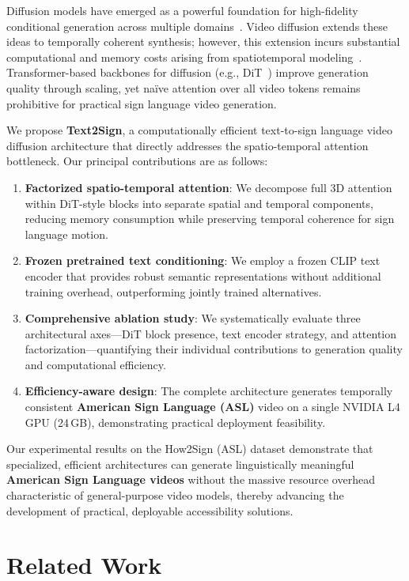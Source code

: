 \documentclass{ieeeaccess}
\begin{document}
Diffusion models have emerged as a powerful foundation for high-fidelity conditional generation across multiple domains~\cite{ho2020ddpm, rombach2022ldm}. Video diffusion extends these ideas to temporally coherent synthesis; however, this extension incurs substantial computational and memory costs arising from spatiotemporal modeling~\cite{ho2022videodiffusion}. Transformer-based backbones for diffusion (e.g., DiT~\cite{peebles2023dit}) improve generation quality through scaling, yet na\"{i}ve attention over all video tokens remains prohibitive for practical sign language video generation.

We propose \textbf{Text2Sign}, a computationally efficient text-to-sign language video diffusion architecture that directly addresses the spatio-temporal attention bottleneck. Our principal contributions are as follows:
\begin{enumerate}
    \item \textbf{Factorized spatio-temporal attention}: We decompose full 3D attention within DiT-style blocks into separate spatial and temporal components, reducing memory consumption while preserving temporal coherence for sign language motion.
    \item \textbf{Frozen pretrained text conditioning}: We employ a frozen CLIP text encoder that provides robust semantic representations without additional training overhead, outperforming jointly trained alternatives.
    \item \textbf{Comprehensive ablation study}: We systematically evaluate three architectural axes---DiT block presence, text encoder strategy, and attention factorization---quantifying their individual contributions to generation quality and computational efficiency.
    \item \textbf{Efficiency-aware design}: The complete architecture generates temporally consistent \textbf{American Sign Language (ASL)} video on a single NVIDIA L4 GPU (24\,GB), demonstrating practical deployment feasibility.
\end{enumerate}

Our experimental results on the How2Sign (ASL) dataset demonstrate that specialized, efficient architectures can generate linguistically meaningful \textbf{American Sign Language videos} without the massive resource overhead characteristic of general-purpose video models, thereby advancing the development of practical, deployable accessibility solutions.

\section{Related Work}
\label{sec:related_work}
\end{document}
